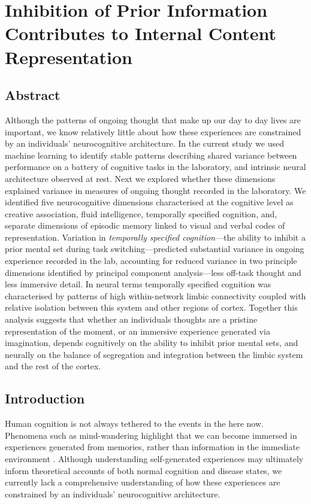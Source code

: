 \chapter{Inhibition of Prior Information Contributes to Internal Content Representation}
\label{ch:study3}
\section{Abstract}
Although the patterns of ongoing thought that make up our day to day lives are important, we know relatively little about how these experiences are constrained by an individuals' neurocognitive architecture. In the current study we used machine learning to identify stable patterns describing shared variance between performance on a battery of cognitive tasks in the laboratory, and intrinsic neural architecture observed at rest. Next we explored whether these dimensions explained variance in measures of ongoing thought recorded in the laboratory. We identified five neurocognitive dimensions characterised at the cognitive level as creative association, fluid intelligence, temporally specified cognition, and, separate dimensions of episodic memory linked to visual and verbal codes of representation. Variation in \textit{temporally specified cognition}---the ability to inhibit a prior mental set during task switching---predicted substantial variance in ongoing experience recorded in the lab, accounting for reduced variance in two principle dimensions identified by principal component analysis---less off-task thought and less immersive detail. In neural terms temporally specified cognition was characterised by patterns of high within-network limbic connectivity coupled with relative isolation between this system and other regions of cortex. Together this analysis suggests that whether an individuals thoughts are a pristine representation of the moment, or an immersive experience generated via imagination, depends cognitively on the ability to inhibit prior mental sets, and neurally on the balance of segregation and integration between the limbic system and the rest of the cortex.

\section{Introduction}
\label{study3:intro}
Human cognition is not always tethered to the events in the here now. Phenomena such as mind-wandering highlight that we can become immersed in experiences generated from memories, rather than information in the immediate environment \cite{SmallwoodSchooler2015}. Although understanding self-generated experiences may ultimately inform theoretical accounts of both normal cognition and disease states, we currently lack a comprehensive understanding of how these experiences are constrained by an individuals' neurocognitive architecture.

